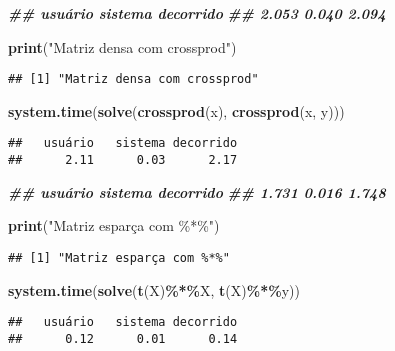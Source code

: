 \documentclass[
]{article}
\newenvironment{Shaded}{\begin{snugshade}}{\end{snugshade}}
\newcommand{\DocumentationTok}[1]{\textcolor[rgb]{0.56,0.35,0.01}{\textbf{\textit{#1}}}}
\newcommand{\FunctionTok}[1]{\textcolor[rgb]{0.13,0.29,0.53}{\textbf{#1}}}
\newcommand{\NormalTok}[1]{#1}
\newcommand{\SpecialCharTok}[1]{\textcolor[rgb]{0.81,0.36,0.00}{\textbf{#1}}}
\newcommand{\StringTok}[1]{\textcolor[rgb]{0.31,0.60,0.02}{#1}}
\begin{document}
\begin{Shaded}
\begin{Highlighting}[]
\DocumentationTok{\#\# usuário sistema decorrido}
\DocumentationTok{\#\# 2.053 0.040 2.094}

\FunctionTok{print}\NormalTok{(}\StringTok{"Matriz densa com crossprod"}\NormalTok{)}
\end{Highlighting}
\end{Shaded}

\begin{verbatim}
## [1] "Matriz densa com crossprod"
\end{verbatim}

\begin{Shaded}
\begin{Highlighting}[]
\FunctionTok{system.time}\NormalTok{(}\FunctionTok{solve}\NormalTok{(}\FunctionTok{crossprod}\NormalTok{(x), }\FunctionTok{crossprod}\NormalTok{(x, y)))}
\end{Highlighting}
\end{Shaded}

\begin{verbatim}
##   usuário   sistema decorrido 
##      2.11      0.03      2.17
\end{verbatim}

\begin{Shaded}
\begin{Highlighting}[]
\DocumentationTok{\#\# usuário sistema decorrido}
\DocumentationTok{\#\# 1.731 0.016 1.748}

\FunctionTok{print}\NormalTok{(}\StringTok{"Matriz esparça com \%*\%"}\NormalTok{)}
\end{Highlighting}
\end{Shaded}

\begin{verbatim}
## [1] "Matriz esparça com %*%"
\end{verbatim}

\begin{Shaded}
\begin{Highlighting}[]
\FunctionTok{system.time}\NormalTok{(}\FunctionTok{solve}\NormalTok{(}\FunctionTok{t}\NormalTok{(X)}\SpecialCharTok{\%*\%}\NormalTok{X, }\FunctionTok{t}\NormalTok{(X)}\SpecialCharTok{\%*\%}\NormalTok{y))}
\end{Highlighting}
\end{Shaded}

\begin{verbatim}
##   usuário   sistema decorrido 
##      0.12      0.01      0.14
\end{verbatim}
\end{document}
